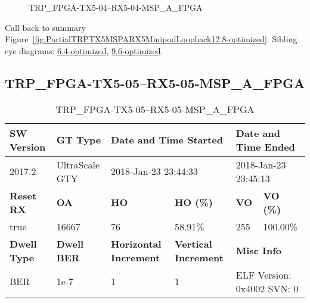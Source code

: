 \begin{figure}[h]
\caption{TRP\_FPGA-TX5-04--RX5-04-MSP\_A\_FPGA} \label{fig:TRPFPGATX504RX504MSPAFPGA12.8-optimized}
\end{figure}

Call back to summary Figure~\ref{fig:PartialTRPTX5MSPARX5MinipodLoopback12.8-optimized}.
Sibling eye diagrams: \hyperref[sec:TRPFPGATX504RX504MSPAFPGA6.4-optimized]{6.4-optimized}, \hyperref[sec:TRPFPGATX504RX504MSPAFPGA9.6-optimized]{9.6-optimized}.

\clearpage
\newpage


\subsection{TRP\_FPGA-TX5-05--RX5-05-MSP\_A\_FPGA}\label{sec:TRPFPGATX505RX505MSPAFPGA12.8-optimized}

\begin{table}[h]
\centering
\caption{TRP\_FPGA-TX5-05--RX5-05-MSP\_A\_FPGA}
\label{tab:TRPFPGATX505RX505MSPAFPGA12.8-optimized}
\begin{tabular}{@{}|l|l|l|l|l|l|@{}}
\toprule
\textbf{SW Version}                & \textbf{GT Type}   & \multicolumn{2}{l|}{\textbf{Date and Time Started}}            & \multicolumn{2}{l|}{\textbf{Date and Time Ended}}        \\ \midrule
2017.2                       & UltraScale GTY          & \multicolumn{2}{l|}{2018-Jan-23 23:44:33}                   & \multicolumn{2}{l|}{2018-Jan-23 23:45:13}               \\ \midrule
\textbf{Reset RX}                  & \textbf{OA} & \textbf{HO}   & \textbf{HO (\%)} & \textbf{VO} & \textbf{VO (\%)} \\ \midrule
true & 16667        & 76          & 58.91\%        & 255        & 100.00\%       \\ \midrule
\textbf{Dwell Type}                & \textbf{Dwell BER} & \textbf{Horizontal Increment} & \textbf{Vertical Increment}    & \multicolumn{2}{l|}{\textbf{Misc Info}}                  \\ \midrule
BER                            & 1e-7        & 1        & 1           & \multicolumn{2}{l|}{ELF Version: 0x4002 SVN: 0}                         \\ \bottomrule
\end{tabular}
\end{table}

